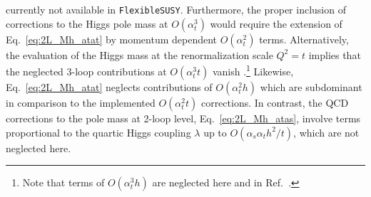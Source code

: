 \documentclass[final,3p,11pt,pdflatex]{elsarticle}
\makeatletter
\newcommand{\fs}{\texttt{FlexibleSUSY}\@\xspace}
\def\at{\alpha_t}
\def\as{\alpha_s}
\makeatother
\begin{document}
currently not available in \fs. Furthermore, the proper inclusion of
corrections to the Higgs pole mass at $O(\at^3)$
would require the extension of Eq.~\eqref{eq:2L_Mh_atat} by momentum
dependent $O(\at^2)$ terms. Alternatively, the evaluation of the Higgs mass at
the renormalization scale $Q^2 = t$ implies that the neglected
3-loop contributions at $O(\at^3 t)$ vanish
\cite{Martin:2014cxa}.\footnote{Note that terms of $O(\at^3 h)$ are
  neglected here and in Ref.\ \cite{Martin:2014cxa}.}
Likewise, Eq.~\eqref{eq:2L_Mh_atat} neglects contributions of $O(\at^2h)$ which are
subdominant in comparison to the implemented $O(\at^2t)$ corrections.
In contrast, the QCD corrections to the pole mass at 2-loop level, Eq.~\eqref{eq:2L_Mh_atas}, involve
terms proportional to the quartic Higgs coupling $\lambda$ up to $O(\as\at h^2/t)$, which are not
neglected here.
\end{document}
